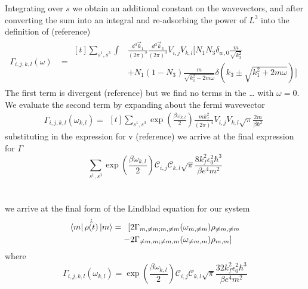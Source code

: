 Integrating over \(s\) we obtain
an additional constant on the
wavevectors, and after
converting the sum into
an integral and re-adsorbing
the power of \(L^3\) into the
definition of (reference)
\begin{align}
  \Gamma_{i,j, k,l}(\omega) & =\begin{aligned}[t]
    \sum_{s^1,s^3} \int &
    \frac{d^3\vec{k}_1}{{(2\pi)}^3}
    \frac{d^3\vec{k}_3}{{(2\pi)}^3}
    V_{i,j} V_{k,l} [
    N_1 N_3 \delta_{w, 0} \frac{m}{\sqrt{k_3^2}} \\
                        & + N_1 (1 - N_3)
        \frac{m}{\sqrt{k_1^2 - 2m\omega}}
        \delta({k_3 \pm \sqrt{k_1^2 + 2m\omega}}) ]
  \end{aligned}
\end{align}
The first term is divergent (reference)
but we find no terms in the \ldots
with \(\omega = 0\).
We evaluate the second term
by expanding about the fermi
wavevector
\begin{equation}
  \Gamma_{i,j, k,l}(\omega_{k,l}) =\begin{aligned}[t]
    \sum_{s^1,s^3} \exp{(\frac{\beta \omega_{k,l}}{2})} \frac{m k_f^2 }{{(2\pi)}^4}
    V_{i,j} V_{k,l} \sqrt{\pi} \frac{2m}{\beta \hbar^2}
  \end{aligned}
\end{equation}
substituting in the expression
for v (reference)
we arrive at the final
expression for \(\Gamma \)
\begin{equation}
  \sum_{s^1,s^3} \exp{(\frac{\beta \omega_{k,l}}{2})}
  \mathcal{C}_{i,j} \mathcal{C}_{k,l}
  \sqrt{\pi} \frac{8 k_f^2 \epsilon_0^2 \hbar^3}{\beta e^4 m^2}
\end{equation}

\section{}
we arrive at the final form of
the Lindblad equation
for our system
\begin{equation}
  \bra{m}\dot{\hat{\rho{}(t)}} \ket{m} = \begin{aligned}[t]
    [ & 2\Gamma_{m,\neq m;m, \neq m}(\omega_{m,\neq m})\rho_{\neq m, \neq m} \\
    - & 2\Gamma_{\neq m,m;\neq m, m}(\omega_{\neq m,m})\rho_{m, m}]
  \end{aligned}
\end{equation}
where
\begin{equation}
  \Gamma_{i,j, k,l}(\omega_{k,l})   =
  \exp{(\frac{\beta \omega_{k,l}}{2})}
  \mathcal{C}_{i,j} \mathcal{C}_{k,l}
  \sqrt{\pi} \frac{32 k_f^2 \epsilon_0^2 \hbar^3}{\beta e^4 m^2}
\end{equation}

